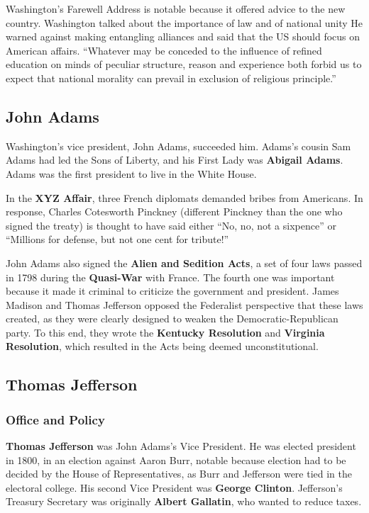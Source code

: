 Washington's Farewell Address is notable because it offered advice to the new country.
Washington talked about the importance of law and of national unity
He warned against making entangling alliances and said that the US should focus on American affairs.
``Whatever may be conceded to the influence of refined education on minds of peculiar structure,
reason and experience both forbid us to expect that national morality
can prevail in exclusion of religious principle.''

\subsection*{John Adams}

Washington's vice president, John Adams, succeeded him.
Adams's cousin Sam Adams had led the Sons of Liberty,
and his First Lady was \textbf{Abigail Adams}.
Adams was the first president to live in the White House.

In the \textbf{XYZ Affair}, three French diplomats demanded bribes from Americans.
In response, Charles Cotesworth Pinckney (different Pinckney than the one who signed the treaty)
is thought to have said either
``No, no, not a sixpence'' or ``Millions for defense, but not one cent for tribute!''

John Adams also signed the \textbf{Alien and Sedition Acts},
a set of four laws passed in 1798 during the \textbf{Quasi-War} with France.
The fourth one was important because it made it criminal to criticize the government and president.
James Madison and Thomas Jefferson opposed the Federalist perspective that these laws created,
as they were clearly designed to weaken the Democratic-Republican party.
To this end, they wrote the \textbf{Kentucky Resolution} and \textbf{Virginia Resolution},
which resulted in the Acts being deemed unconstitutional.

\subsection*{Thomas Jefferson}

\subsubsection*{Office and Policy}

\textbf{Thomas Jefferson} was John Adams's Vice President.
He was elected president in 1800, in an election against Aaron Burr,
notable because election had to be decided by the House of Representatives,
as Burr and Jefferson were tied in the electoral college.
His second Vice President was \textbf{George Clinton}.
Jefferson's Treasury Secretary was originally \textbf{Albert Gallatin}, who wanted to reduce taxes.

